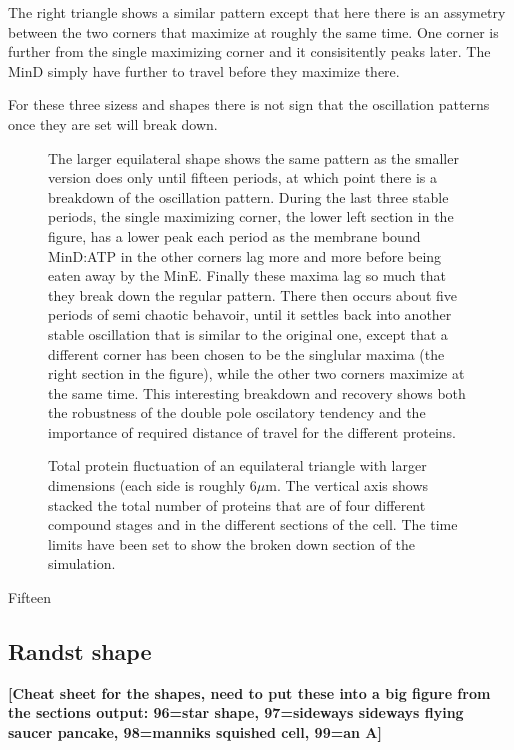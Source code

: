 \documentclass[letterpaper,twocolumn,amsmath,amssymb,pre]{revtex4-1}
\newcommand{\red}[1]{{\bf \color{red} #1}}
\newcommand{\fixme}[1]{\red{[#1]}}
\newcommand\micron{\ensuremath{\mu\text{m}}}
\begin{document}
The right triangle shows a similar pattern except that here there is
an assymetry between the two corners that maximize at roughly the same
time.  One corner is further from the single maximizing corner and it
consisitently peaks later.  The MinD simply have further to travel
before they maximize there.

For these three sizess and shapes there is not sign that the
oscillation patterns once they are set will break down.

\begin{figure}
  \caption{Total protein fluctuation of an equilateral triangle with
    larger dimensions (each side is roughly $6\micron$.  The vertical
    axis shows stacked the total number of proteins that are of four
    different compound stages and in the different sections of the
    cell. The time limits have been set to show the broken down
    section of the simulation.}
  \label{box-triangle}

The larger equilateral shape shows the same pattern as the smaller
version does only until fifteen periods, at which point there is a
breakdown of the oscillation pattern.  During the last three stable
periods, the single maximizing corner, the lower left section in the
figure, has a lower peak each period as the membrane bound MinD:ATP in
the other corners lag more and more before being eaten away by the
MinE.  Finally these maxima lag so much that they break down the
regular pattern.  There then occurs about five periods of semi chaotic
behavoir, until it settles back into another stable oscillation that
is similar to the original one, except that a different corner has
been chosen to be the singlular maxima (the right section in the
figure), while the other two corners maximize at the same time.  This
interesting breakdown and recovery shows both the robustness of the
double pole oscilatory tendency and the importance of required
distance of travel for the different proteins.

\end{figure}


Fifteen


\subsection{Randst shape}
\fixme{Cheat sheet for the shapes, need to put these into a big figure
  from the sections output: 96=star shape, 97=sideways sideways
  flying saucer pancake, 98=manniks squished cell, 99=an A}
\end{document}
